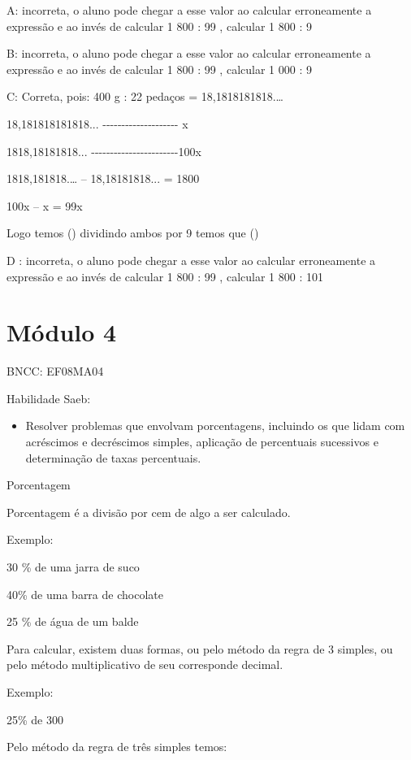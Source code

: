 A: incorreta, o aluno pode chegar a esse valor ao calcular erroneamente
a expressão e ao invés de calcular 1 800 : 99 , calcular 1 800 : 9

B: incorreta, o aluno pode chegar a esse valor ao calcular erroneamente
a expressão e ao invés de calcular 1 800 : 99 , calcular 1 000 : 9

C: Correta, pois: 400 g : 22 pedaços = 18,1818181818.\ldots{}

18,181818181818...
-\/-\/-\/-\/-\/-\/-\/-\/-\/-\/-\/-\/-\/-\/-\/-\/-\/-\/-\/- x

1818,18181818...
-\/-\/-\/-\/-\/-\/-\/-\/-\/-\/-\/-\/-\/-\/-\/-\/-\/-\/-\/-\/-\/-\/-100x

1818,181818.\ldots{} -- 18,18181818... = 1800

100x -- x = 99x

Logo temos () dividindo ambos por 9 temos que
()

D : incorreta, o aluno pode chegar a esse valor ao calcular erroneamente
a expressão e ao invés de calcular 1 800 : 99 , calcular 1 800 : 101

\section{Módulo 4}

BNCC: EF08MA04

Habilidade Saeb:

\begin{itemize}
\tightlist
\item
  Resolver problemas que envolvam porcentagens, incluindo os que lidam
  com acréscimos e decréscimos simples, aplicação de percentuais
  sucessivos e determinação de taxas percentuais.
\end{itemize}

Porcentagem

Porcentagem é a divisão por cem de algo a ser calculado.

Exemplo:

30 \% de uma jarra de suco

40\% de uma barra de chocolate

25 \% de água de um balde

Para calcular, existem duas formas, ou pelo método da regra de 3
simples, ou pelo método multiplicativo de seu corresponde decimal.

Exemplo:

25\% de 300

Pelo método da regra de três simples temos:

